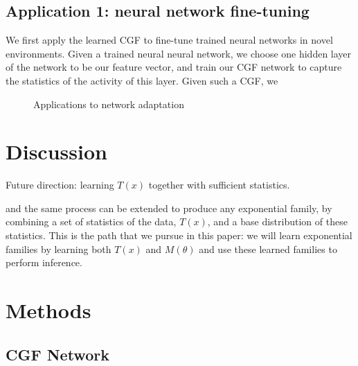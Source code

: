\documentclass[11pt]{article}      %
\begin{document}
\newpage
\subsection{Application 1: neural network fine-tuning}

We first apply the learned CGF to fine-tune trained neural networks in novel environments.
Given a trained neural neural network, we choose one hidden layer of the network to be our feature vector, and train our CGF network to capture the statistics of the activity of this layer.
Given such a CGF, we







\begin{figure}[tb]
  \centering
  \begin{subfigure}[t]{\textwidth}
    \centering
    \caption{}
    \label{fig:3a_adaptation_example}
  \end{subfigure}

  \caption{Applications to network adaptation }
  \label{fig:3_adaptation_example}
\end{figure}




\newpage





\section{Discussion}

Future direction: learning $T(x)$ together with sufficient statistics.


and the same process can be extended to produce any exponential family, by combining a set of statistics of the data, $T(x)$, and a base distribution of these statistics.
This is the path that we pursue in this paper: we will learn exponential families by learning both $T(x)$ and $M(\theta)$ and use these learned families to perform inference.



\section{Methods}
\subsection{CGF Network} \label{sec:network_architecture}
\end{document}
